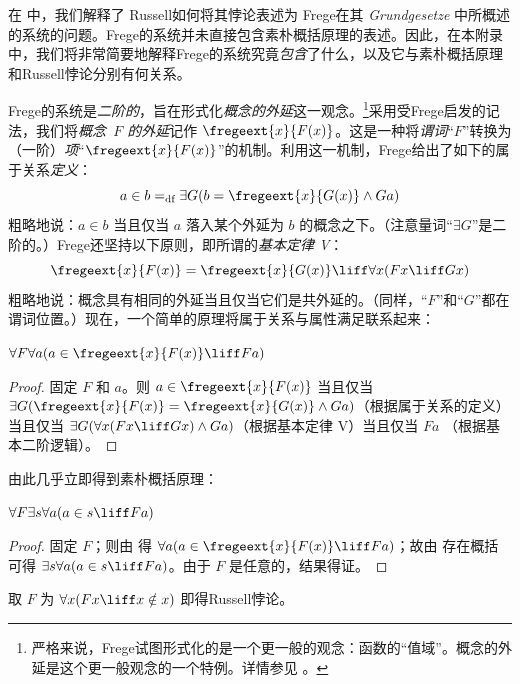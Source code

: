 \documentclass[../../../include/open-logic-section]{subfiles}
\begin{document}


在  中，我们解释了 Russell如何将其悖论表述为 Frege在其 \emph{Grundgesetze} 中所概述的系统的问题。Frege的系统并未直接包含素朴概括原理的表述。因此，在本附录中，我们将非常简要地解释Frege的系统究竟\emph{包含}了什么，以及它与素朴概括原理和Russell悖论分别有何关系。

Frege的系统是\emph{二阶的}，旨在形式化\emph{概念的外延}这一观念。\footnote{严格来说，Frege试图形式化的是一个更一般的观念：函数的“值域”。概念的外延是这个更一般观念的一个特例。详情参见 \citet[pp.\ 8--9]{Heck2012}。}采用受Frege启发的记法，我们将\emph{概念~$F$ 的外延}记作 $\fregeext{x}{F(x)}$。这是一种将\emph{谓词}“$F$”转换为（一阶）\emph{项}“$\fregeext{x}{F(x)}$”的机制。利用这一机制，Frege给出了如下的属于关系\emph{定义}：\[
	a \in b =_{\text{df}} \exists G(b = \fregeext{x}{G(x)} \land Ga)
\]
粗略地说：$a \in b$ 当且仅当 $a$ 落入某个外延为 $b$ 的概念之下。（注意量词“$\exists G$”是二阶的。）Frege还坚持以下原则，即所谓的\emph{基本定律 V}：$$\fregeext{x}{F(x)} = \fregeext{x}{G(x)} \liff \forall x (Fx \liff Gx)$$
粗略地说：概念具有相同的外延当且仅当它们是共外延的。（同样，“$F$”和“$G$”都在谓词位置。）现在，一个简单的原理将属于关系与属性满足联系起来：

\begin{lem}
$\forall F \forall a(a \in \fregeext{x}{F(x)} \liff Fa)$
\end{lem}

\begin{proof}
固定 $F$ 和 $a$。则 $a \in \fregeext{x}{F(x)}$ 当且仅当 $\exists G(\fregeext{x}{F(x)}
= \fregeext{x}{G(x)} \land Ga)$（根据属于关系的定义）当且仅当
$\exists G(\forall x(Fx \liff Gx) \land Ga)$（根据基本定律 V）当且仅当 $Fa$
（根据基本二阶逻辑）。
\end{proof}

由此几乎立即得到素朴概括原理：

\begin{lem}
$\forall F \exists s \forall a (a \in s \liff Fa)$
\end{lem}

\begin{proof}
固定 $F$；则由  得 $\forall a (a \in
\fregeext{x}{F(x)} \liff Fa)$；故由
存在概括可得 $\exists s\forall a(a \in s \liff Fa)$。由于 $F$ 是任意的，结果得证。
\end{proof}

取 $F$ 为 $\forall x(Fx \liff x \notin x)$ 即得Russell悖论。
\end{document}
